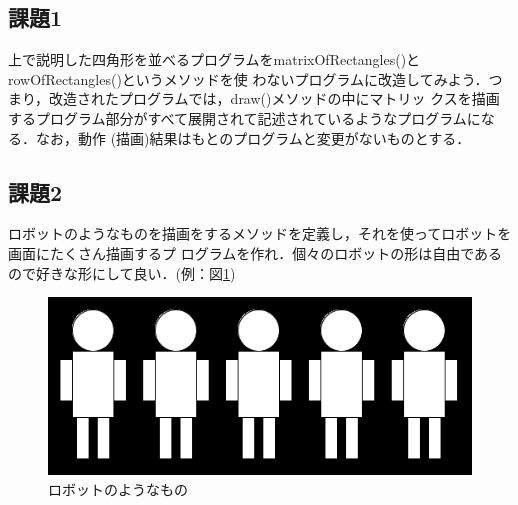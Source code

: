 \documentclass[a4paper,xelatex,ja=standard]{bxjsarticle}
\begin{document}
\subsection{課題1}
上で説明した四角形を並べるプログラムをmatrixOfRectangles()とrowOfRectangles()というメソッドを使
わないプログラムに改造してみよう．つまり，改造されたプログラムでは，draw()メソッドの中にマトリッ
クスを描画するプログラム部分がすべて展開されて記述されているようなプログラムになる．なお，動作
(描画)結果はもとのプログラムと変更がないものとする．

\subsection{課題2}
ロボットのようなものを描画をするメソッドを定義し，それを使ってロボットを画面にたくさん描画するプ
ログラムを作れ．個々のロボットの形は自由であるので好きな形にして良い．(例：図\ref{kadai2})

\begin{figure}[hbtp]
\centerline{
 \includegraphics[scale=1.0]{robots.png}
}
\caption{ロボットのようなもの}
\label{kadai2}
\end{figure}
\end{document}
